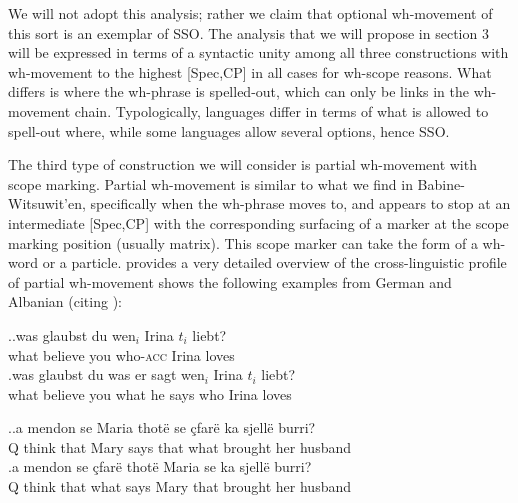 \documentclass[charis]{glossa}
\begin{document}
We will not adopt this analysis; rather we claim that optional wh-movement of this sort is an exemplar of SSO. The analysis that we will propose in section 3 will be expressed in terms of a syntactic unity among all three constructions with wh-movement to the highest [Spec,CP] in all cases for wh-scope reasons. What differs is where the wh-phrase is spelled-out, which can only be links in the wh-movement chain. Typologically, languages differ in terms of what is allowed to spell-out where, while some languages allow several options, hence SSO.

The third type of construction we will consider is partial wh-movement with scope marking. Partial wh-movement is similar to what we find in Babine-Witsuwit'en, specifically when the wh-phrase moves to, and appears to stop at an intermediate [Spec,CP] with the corresponding surfacing of a marker at the scope marking position (usually matrix). This scope marker can take the form of a wh-word or a particle. \cite{fanselow:2006} provides a very detailed overview of the cross-linguistic profile of partial wh-movement shows the following examples from German and Albanian (citing \citealp{turano:1995}):

\ex.\label{wh.250}\ag.\label{wh.250a}was glaubst du wen$_i$ Irina $t_i$ liebt?\\
   what believe you who-\textsc{acc} Irina {} loves\\
   \bg.\label{wh.250b}was glaubst du was er sagt wen$_i$ Irina $t_i$ liebt?\\
   what believe you what he says who Irina loves\\

\ex.\label{wh.260}\ag.\label{wh.260a}a mendon se Maria thot\"e se \c{c}far\"e ka sjell\"e burri?\\
   Q think that Mary says that what brought her husband\\
   \bg.\label{wh.260b}a mendon se \c{c}far\"e thot\"e Maria se ka sjell\"e burri?\\
   Q think that what says Mary that brought her husband\\
\end{document}
